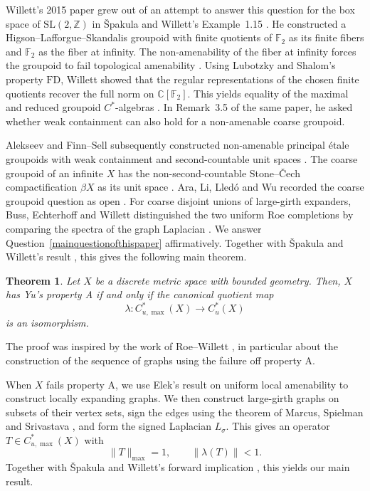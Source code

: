\documentclass[11pt,a4paper]{article}
\newtheorem{theorem}{Theorem}[section]
\theoremstyle{definition}\newtheorem{definition}[theorem]{Definition}
\theoremstyle{remark}\newtheorem{remark}[theorem]{Remark}
\newcommand{\Cu}{C_u^*}
\newcommand{\Cum}{C_{u,\max}^*}
\newcommand{\norm}[1]{\lVert#1\rVert}
\begin{document}
Willett's 2015 paper grew out of an attempt to answer this question
for the box space of $\mathrm{SL}(2,\mathbb Z)$ in \v{S}pakula and
Willett's Example~1.15 \cite[Remark 3.5]{Willett15}.
He constructed a Higson--Lafforgue--Skandalis groupoid with finite
quotients of $\mathbb F_2$ as its finite fibers and $\mathbb F_2$
as the fiber at infinity. The non-amenability of the fiber at
infinity forces the groupoid to fail topological amenability
\cite[Lemma 2.4]{Willett15}. Using Lubotzky and Shalom's property
$\mathrm{FD}$, Willett showed that the regular representations of
the chosen finite quotients recover the full norm on
$\mathbb C[\mathbb F_2]$. This yields equality of the maximal and
reduced groupoid $C^*$-algebras \cite[Lemmas 2.7 and 2.8]{Willett15}.
In Remark~3.5 of the same paper, he asked whether weak containment
can also hold for a non-amenable coarse groupoid.

Alekseev and Finn--Sell subsequently constructed non-amenable
principal \'etale groupoids with weak containment and second-countable
unit spaces \cite[Section 2]{AFS}. The coarse groupoid of an infinite
$X$ has the non-second-countable Stone--\v{C}ech compactification
$\beta X$ as its unit space \cite[Section 3]{STY}. Ara, Li, Lled\'o
and Wu recorded the coarse groupoid question as open
\cite[Example 4.6]{ALLW}. For coarse disjoint unions of large-girth
expanders, Buss, Echterhoff and Willett distinguished the two
uniform Roe completions by comparing the spectra of the graph
Laplacian \cite[proof of Lemma 4.7]{BEW}. 
We answer Question~\ref{mainquestionofthispaper} affirmatively.
Together with \v{S}pakula and Willett's result
\cite[Proposition 1.3]{SW}, this gives the following main theorem.

\begin{theorem}\label{thm:equivalence}
Let $X$ be a discrete metric space with bounded geometry. Then, $X$ has Yu's
property A if and only if the canonical quotient map
$$
\lambda:\Cum(X)\to\Cu(X)
$$
is an isomorphism.
\end{theorem}


The proof was inspired by the work of Roe--Willett \cite{RW}, in particular about the construction of the sequence of graphs using the failure off property A.  

When $X$ fails property A, we use Elek's result on uniform local
amenability \cite{Elek} to construct locally expanding graphs. We
then construct large-girth graphs on subsets of their vertex sets,
sign the edges using the theorem of Marcus, Spielman and Srivastava
\cite{MSS}, and form the signed Laplacian $L_\sigma$. This gives an
operator $T\in\Cum(X)$ with
$$
\norm{T}_{\max}=1,\qquad \norm{\lambda(T)}<1.
$$
Together with \v{S}pakula and Willett's forward implication
\cite[Proposition 1.3]{SW}, this yields our main result.
\end{document}

